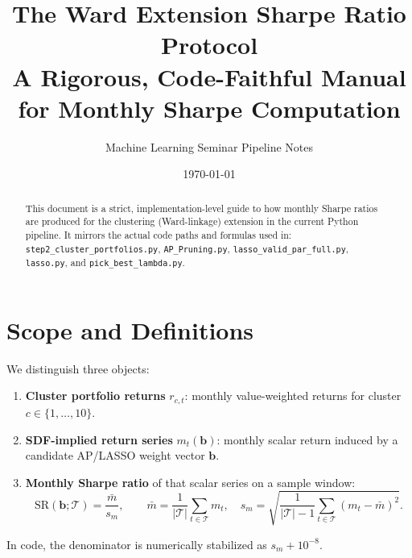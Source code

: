 ﻿\documentclass[11pt]{article}
\title{\textbf{The Ward Extension Sharpe Ratio Protocol}\\
\large A Rigorous, Code-Faithful Manual for Monthly Sharpe Computation}
\author{Machine Learning Seminar Pipeline Notes}
\date{\today}
\begin{document}
\maketitle

\begin{abstract}
This document is a strict, implementation-level guide to how monthly Sharpe ratios are produced for the clustering (Ward-linkage) extension in the current Python pipeline. It mirrors the actual code paths and formulas used in:
\texttt{step2\_cluster\_portfolios.py}, \texttt{AP\_Pruning.py}, \texttt{lasso\_valid\_par\_full.py}, \texttt{lasso.py}, and \texttt{pick\_best\_lambda.py}.
\end{abstract}

\section{Scope and Definitions}
We distinguish three objects:
\begin{enumerate}[label=\textbf{D\arabic*.}]
  \item \textbf{Cluster portfolio returns} $r_{c,t}$: monthly value-weighted returns for cluster $c \in \{1,\dots,10\}$.
  \item \textbf{SDF-implied return series} $m_t(\bm b)$: monthly scalar return induced by a candidate AP/LASSO weight vector $\bm b$.
  \item \textbf{Monthly Sharpe ratio} of that scalar series on a sample window:
  \[
    \mathrm{SR}(\bm b;\mathcal T)=\frac{\bar m}{s_m},\qquad
    \bar m=\frac{1}{|\mathcal T|}\sum_{t\in\mathcal T}m_t,\quad
    s_m=\sqrt{\frac{1}{|\mathcal T|-1}\sum_{t\in\mathcal T}(m_t-\bar m)^2}.
  \]
\end{enumerate}

\noindent
In code, the denominator is numerically stabilized as $s_m + 10^{-8}$.
\end{document}
